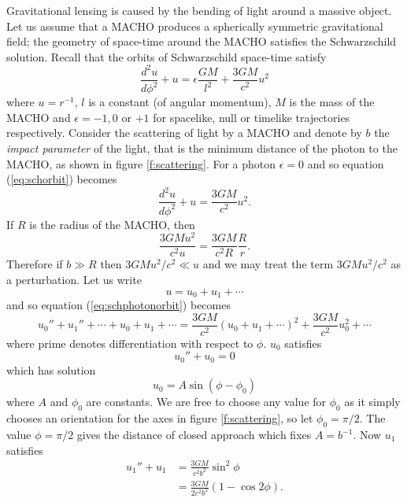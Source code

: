 Gravitational lensing is caused by the bending of light around a massive
object. Let us assume that a MACHO produces a spherically symmetric
gravitational field; the geometry of space-time around the MACHO satisfies the
Schwarzschild solution. Recall that the orbits of Schwarzschild space-time
satisfy
\begin{equation}
\frac{d^2 u}{d\phi^2} + u = \epsilon \frac{GM}{l^2} + \frac{3GM}{c^2}u^2
\label{eq:schorbit}
\end{equation}
where $u = r^{-1}$, $l$ is a constant (of angular momentum), $M$ is the mass
of the MACHO and $\epsilon = -1,0$ or $+1$ for spacelike, null or timelike
trajectories respectively. Consider the scattering of light by a MACHO and
denote by $b$ the \emph{impact parameter} of the light, that is the minimum
distance of the photon to the MACHO, as shown in figure \ref{f:scattering}.
For a photon $\epsilon = 0$ and so equation (\ref{eq:schorbit}) becomes
\begin{equation}
\frac{d^2 u}{d\phi^2} + u =  \frac{3GM}{c^2}u^2.
\label{eq:schphotonorbit}
\end{equation}
If $R$ is the radius of the MACHO, then
\begin{equation}
\frac{3GMu^2}{c^2u} = \frac{3GM}{c^2R} \frac{R}{r}.
\end{equation}
Therefore if $b \gg R$ then $3GMu^2/c^2 \ll u$ and we may treat the term
$3GMu^2/c^2$ as a perturbation. Let us write
\begin{equation}
u = u_0 + u_1 + \cdots
\end{equation}
and so equation (\ref{eq:schphotonorbit}) becomes
\begin{equation}
u_0'' + u_1'' + \cdots + u_0 + u_1 + \cdots = \frac{3GM}{c^2}\left(u_0 + u_1 +
\cdots\right)^2 + \frac{3GM}{c^2}u_0^2 + \cdots
\end{equation}
where prime denotes differentiation with respect to $\phi$. $u_0$ satisfies
\begin{equation}
u_0'' + u_0 = 0
\end{equation}
which has solution
\begin{equation}
u_0 = A \sin \left(\phi - \phi_0\right)
\end{equation}
where $A$ and $\phi_0$ are constants. We are free to choose any value for
$\phi_0$ as it simply chooses an orientation for the axes in figure
\ref{f:scattering}, so let $\phi_0 = \pi /2$. The value $\phi = \pi / 2$
gives the distance of closed approach which fixes $A = b^{-1}$. Now $u_1$
satisfies
\begin{equation}
\begin{split}
u_1'' + u_1 &= \frac{3GM}{c^2b^2} \sin^2 \phi \\
&= \frac{3GM}{2c^2b^2}\left(1 - \cos 2\phi\right).
\label{eq:u1eq}
\end{split}
\end{equation}
